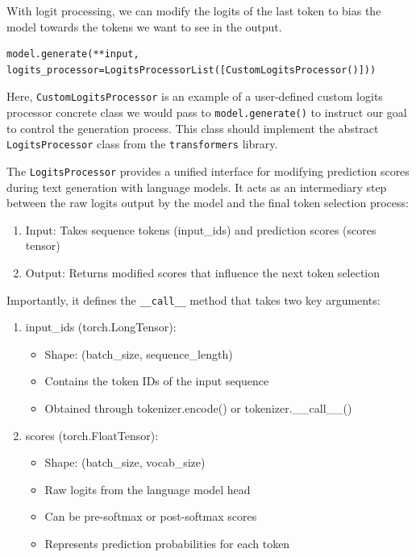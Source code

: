 With logit processing, we can modify the logits of the last token to bias the model towards the tokens we want to see in the output.
\begin{verbatim}
model.generate(**input, logits_processor=LogitsProcessorList([CustomLogitsProcessor()]))
\end{verbatim}

Here, \texttt{CustomLogitsProcessor} is an example of a user-defined custom logits processor concrete class we would pass to \texttt{model.generate()} to instruct our goal to control the generation process. This class should implement the abstract \texttt{LogitsProcessor} class from the \texttt{transformers} library.

The \texttt{LogitsProcessor} provides a unified interface for modifying prediction scores during text generation with language models. It acts as an intermediary step between the raw logits output by the model and the final token selection process:

\begin{enumerate}
    \item Input: Takes sequence tokens (input\_ids) and prediction scores (scores tensor)
    \item Output: Returns modified scores that influence the next token selection
\end{enumerate}

Importantly, it defines the \texttt{\_\_call\_\_} method that takes two key arguments:

\begin{enumerate}
    \item input\_ids (torch.LongTensor): 
    \begin{itemize}
        \item Shape: (batch\_size, sequence\_length)
        \item Contains the token IDs of the input sequence
        \item Obtained through tokenizer.encode() or tokenizer.\_\_call\_\_()
    \end{itemize}
    
    \item scores (torch.FloatTensor):
    \begin{itemize}
        \item Shape: (batch\_size, vocab\_size) 
        \item Raw logits from the language model head
        \item Can be pre-softmax or post-softmax scores
        \item Represents prediction probabilities for each token
    \end{itemize}
\end{enumerate}

